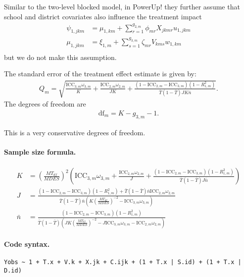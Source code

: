 \documentclass[12pt]{article}
\begin{document}
Similar to the two-level blocked model, in PowerUp! they further assume that school and district covariates also influence the treatment impact
\begin{align*}
\psi_{1,jkm} &= \mu_{1,km} + \sum_{r=1}^{g_{2,m}} \phi_{mr} X_{jkmr} u_{1,jkm}\\
\mu_{1,jkm} &= \xi_{1,m} + \sum_{s=1}^{g_{3,m}} \zeta_{mr} V_{kms} w_{1,km}\\
\end{align*}
but we do not make this assumption.


The standard error of the treatment effect estimate is given by:
\begin{align}Q_m = \sqrt{
\frac{\text{ICC}_{3,m} \omega_{3,m}}{K} +
\frac{\text{ICC}_{2,m} \omega_{2,m}}{JK} +
\frac{(1-\text{ICC}_{2,m} - \text{ICC}_{3,m})(1-R^2_{1,m})}{\bar{T}(1 - \bar{T}) JK\bar{n}}
}.\end{align}
The degrees of freedom are
\begin{align}\text{df}_m = K - g_{3,m} - 1.\end{align}

This is a very conservative degrees of freedom.


\paragraph{Sample size formula.} 
\begin{align}
K &= \left(\frac{MT_{df}}{MDES}\right)^2 \left(\text{ICC}_{3,m} \omega_{3,m} + \frac{\text{ICC}_{2,m} \omega_{2,m}}{J} + \frac{(1-\text{ICC}_{2,m}-\text{ICC}_{3,m})(1-R^2_{1,m})}{\bar{T}(1 - \bar{T}) J \bar{n}} \right)\\
J &= \frac{(1-\text{ICC}_{2,m}-\text{ICC}_{3,m})(1-R^2_{1,m}) + \bar{T}(1 - \bar{T}) \bar{n}\text{ICC}_{2,m} \omega_{2,m}}{\bar{T}(1 - \bar{T}) \bar{n}\left(K \left(\frac{MT_{df}}{MDES}\right)^{-2} - \text{ICC}_{3,m} \omega_{3,m}\right)}\\
\bar{n} &= \frac{(1-\text{ICC}_{2,m}-\text{ICC}_{3,m})(1-R^2_{1,m})}{\bar{T}(1 - \bar{T})\left(JK \left(\frac{MT_{df}}{MDES}\right)^{-2} - J\text{ICC}_{3,m} \omega_{3,m} - \text{ICC}_{2,m} \omega_{2,m}\right)}
\end{align}

\paragraph{Code syntax.}
\begin{verbatim}
Yobs ~ 1 + T.x + V.k + X.jk + C.ijk + (1 + T.x | S.id) + (1 + T.x | D.id) 
\end{verbatim}
\end{document}
